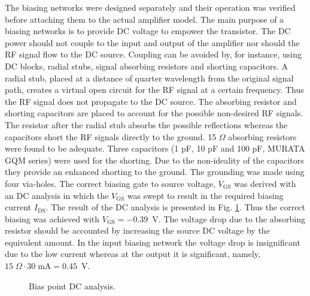 \documentclass[a4paper, 12pt]{article}
\begin{document}
The biasing networks were designed separately and their operation was verified before attaching 
them to the actual amplifier model. The main purpose of a biasing networks is to provide DC 
voltage to empower the transistor. The DC power should not couple to the input and output of 
the amplifier nor should the RF signal flow to the DC source. Coupling can be avoided by, for 
instance, using DC blocks, radial stubs, signal absorbing resistors and shorting capacitors. 
A radial stub, placed at a distance of quarter wavelength from the original signal path, creates 
a virtual open circuit for the RF signal at a certain frequency. Thus the RF signal does not 
propagate to the DC source. The absorbing resistor and shorting capacitors are placed to account 
for the possible non-desired RF signals. The  resistor after the radial stub absorbs the possible 
reflections whereas the capacitors short the RF signals directly to the ground. 15 $\Omega$ 
absorbing resistors were found to be adequate. Three capacitors (1 pF, 10 pF and 100 pF, MURATA 
GQM series) were used for the shorting. Due to the non-ideality of the capacitors they provide 
an enhanced shorting to the ground. The grounding was made using four via-holes. The correct 
biasing gate to source voltage, $V_\mathrm{GS}$ was derived with an DC analysis in which the 
$V_\mathrm{GS}$ was swept to result in the required biasing current $I_\mathrm{DS}$. The 
result of the DC analysis is presented in Fig. \ref{f:bias}. Thus the correct biasing 
was achieved with $V_\mathrm{GS} = -0.39$~V. The voltage drop due to the absorbing 
resistor should be accounted by increasing the source DC voltage by the equivalent amount. In 
the input biasing network the voltage drop is insignificant due to the low current whereas at 
the output it is significant, namely, $15 \; \Omega \cdot 30 \; \mathrm{mA} = 0.45$~V.

\begin{figure}[!h]
	\centering
	\caption{Bias point DC analysis.}
	\label{f:bias}
\end{figure}
\end{document}
